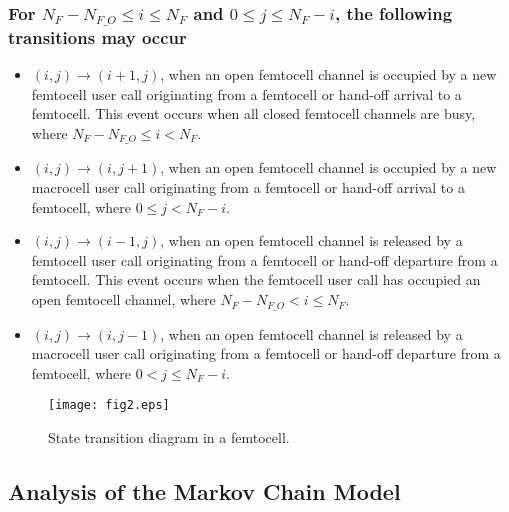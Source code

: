 \documentclass[10pt,final,journal,letterpaper,twoside,twocolumn]{IEEEtran}
\begin{document}
\subsubsection{For ${N_F} - {N_{F\_O}} \le i \le {N_F}$  and  $0 \le j \le {N_F} - i$,
the following transitions may occur}

\begin{itemize}
    \item $\left( {i,j} \right) \to \left( {i + 1,j} \right)$, when an open
femtocell channel is occupied by a new femtocell user call originating from a femtocell or hand-off arrival to a femtocell. This event occurs
when all closed femtocell channels are busy, where ${N_F} - {N_{F\_O}} \le i < {N_F}$.
    \item $\left( {i,j} \right) \to \left( {i,j + 1} \right)$, when an open
femtocell channel is occupied by a new macrocell user call originating from a femtocell or hand-off arrival to a femtocell, where $0 \le j < {N_F} - i$.
    \item $\left( {i,j} \right) \to \left( {i - 1,j} \right)$, when an open
femtocell channel is released by a femtocell user call originating from a femtocell or hand-off departure from a femtocell. This event occurs when the
femtocell user call has occupied an open femtocell channel, where ${N_F} - {N_{F\_O}} < i \le {N_F}$.
    \item $\left( {i,j} \right) \to \left( {i,j - 1} \right)$, when an open
femtocell channel is released by a macrocell user call originating from a femtocell or hand-off departure from a femtocell, where $0 < j \le {N_F} - i$.
\end{itemize}
\begin{figure}
\vspace{0.1in}
\centerline{\texttt{[image: fig2.eps]}}
\caption{\small State transition diagram in a femtocell.}
\end{figure}

\subsection{Analysis of the Markov Chain Model}
\end{document}
